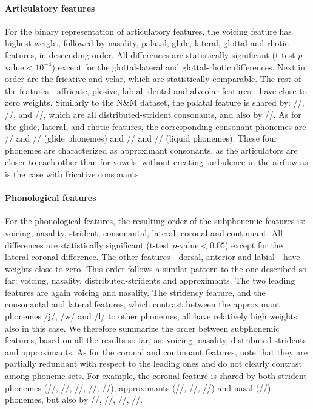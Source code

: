 \paragraph{Articulatory features} For the binary representation of articulatory features, the voicing feature has highest weight, followed by nasality, palatal, glide, lateral, glottal and rhotic features, in descending order. All differences are statistically significant (t-test $p$-value$<10^{-4}$) except for the glottal-lateral and glottal-rhotic differences. Next in order are the fricative and velar, which are statistically comparable. The rest of the features - affricate, plosive, labial, dental and alveolar features - have close to zero weights. Similarly to the N\&M dataset, the palatal feature is shared by: //, //, and //, which are all distributed-strident consonants, and also by //. As for the glide, lateral, and rhotic features, the corresponding consonant phonemes are // and // (glide phonemes) and // and // (liquid phonemes). These four phonemes are characterized as approximant consonants, as the articulators are closer to each other than for vowels, without creating turbulence in the airflow as is the case with fricative consonants. 

\paragraph{Phonological features} For the phonological features, the resulting order of the subphonemic features is: voicing, nasality, strident, consonantal, lateral, coronal and continuant. All differences are statistically significant (t-test $p$-value$<0.05$) except for the lateral-coronal difference. The other features - dorsal, anterior and labial - have weights close to zero. This order follows a similar pattern to the one described so far: voicing, nasality, distributed-stridents and approximants. The two leading features are again voicing and nasality. The stridency feature, and the consonantal and lateral features, which contrast between the approximant phonemes /j/, /w/ and /l/ to other phonemes, all have relatively high weights also in this case. We therefore summarize the order between subphonemic features, based on all the results so far, as: voicing, nasality, distributed-stridents and approximants. As for the coronal and continuant features, note that they are partially redundant with respect to the leading ones and do not clearly contrast among phoneme sets. For example, the coronal feature is shared by both strident phonemes (//, //, //, //, //), approximants (//, //, //) and nasal (//) phonemes, but also by //, //, //, //.


